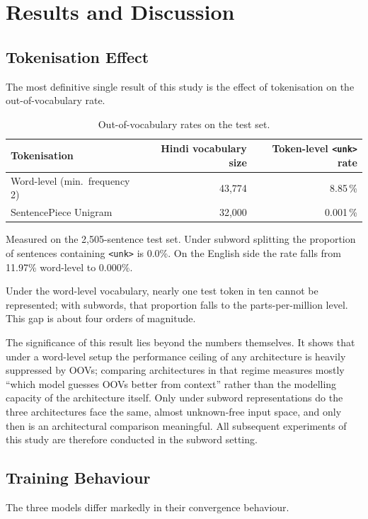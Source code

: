 \documentclass[a4paper,12pt]{vpcoe}
\begin{document}
\chapter{Results and Discussion}

\section{Tokenisation Effect}
The most definitive single result of this study is the effect of tokenisation on the out-of-vocabulary rate.

\begin{table}[h]
\centering
\caption{Out-of-vocabulary rates on the test set.}
\label{tab:unk}
\begin{tabular}{@{}lrr@{}}
\toprule
Tokenisation & Hindi vocabulary size & Token-level \texttt{<unk>} rate \\
\midrule
Word-level (min.\ frequency 2) & 43,774 & 8.85\,\% \\
SentencePiece Unigram & 32,000 & 0.001\,\% \\
\bottomrule
\end{tabular}

\vspace{2pt}
{\footnotesize Measured on the 2,505-sentence test set. Under subword splitting the proportion of sentences containing \texttt{<unk>} is 0.0\%. On the English side the rate falls from 11.97\% word-level to 0.000\%.}
\end{table}

Under the word-level vocabulary, nearly one test token in ten cannot be represented; with subwords, that proportion falls to the parts-per-million level. This gap is about four orders of magnitude.

The significance of this result lies beyond the numbers themselves. It shows that under a word-level setup the performance ceiling of any architecture is heavily suppressed by OOVs; comparing architectures in that regime measures mostly ``which model guesses OOVs better from context'' rather than the modelling capacity of the architecture itself. Only under subword representations do the three architectures face the same, almost unknown-free input space, and only then is an architectural comparison meaningful. All subsequent experiments of this study are therefore conducted in the subword setting.

\section{Training Behaviour}
The three models differ markedly in their convergence behaviour.
\end{document}
